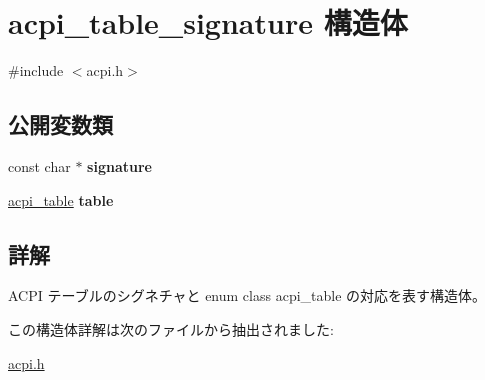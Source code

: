 \hypertarget{structacpi__table__signature}{}\section{acpi\+\_\+table\+\_\+signature 構造体}
\label{structacpi__table__signature}


{\ttfamily \#include $<$acpi.\+h$>$}

\subsection*{公開変数類}
\begin{DoxyCompactItemize}
\item 
\hypertarget{structacpi__table__signature_a87be14e749692c2d9fa195efffd748da}{}\label{structacpi__table__signature_a87be14e749692c2d9fa195efffd748da} 
const char $\ast$ {\bfseries signature}
\item 
\hypertarget{structacpi__table__signature_a055c98fc7371554dadbacdaf538e4583}{}\label{structacpi__table__signature_a055c98fc7371554dadbacdaf538e4583} 
\hyperlink{acpi_8h_a64dfa94462992cc30eb68821513817ff}{acpi\+\_\+table} {\bfseries table}
\end{DoxyCompactItemize}


\subsection{詳解}
A\+C\+PI テーブルのシグネチャと enum class acpi\+\_\+table の対応を表す構造体。 

この構造体詳解は次のファイルから抽出されました\+:\begin{DoxyCompactItemize}
\item 
\hyperlink{acpi_8h}{acpi.\+h}\end{DoxyCompactItemize}

